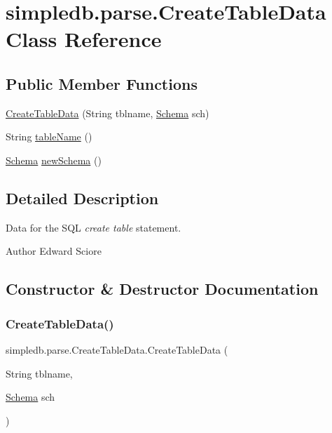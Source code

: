 \hypertarget{classsimpledb_1_1parse_1_1CreateTableData}{}\section{simpledb.\+parse.\+Create\+Table\+Data Class Reference}
\label{classsimpledb_1_1parse_1_1CreateTableData}
\subsection*{Public Member Functions}
\begin{DoxyCompactItemize}
\item 
\hyperlink{classsimpledb_1_1parse_1_1CreateTableData_a5167520c8a9b9829f304ce5a22bd162b}{Create\+Table\+Data} (String tblname, \hyperlink{classsimpledb_1_1record_1_1Schema}{Schema} sch)
\item 
String \hyperlink{classsimpledb_1_1parse_1_1CreateTableData_a9fa3eaadef74386e30af0aaa8b52c272}{table\+Name} ()
\item 
\hyperlink{classsimpledb_1_1record_1_1Schema}{Schema} \hyperlink{classsimpledb_1_1parse_1_1CreateTableData_a857ab82373dbaca585855cbe46819716}{new\+Schema} ()
\end{DoxyCompactItemize}


\subsection{Detailed Description}
Data for the S\+QL {\itshape create table} statement. \begin{DoxyAuthor}{Author}
Edward Sciore 
\end{DoxyAuthor}


\subsection{Constructor \& Destructor Documentation}
\mbox{\label{classsimpledb_1_1parse_1_1CreateTableData_a5167520c8a9b9829f304ce5a22bd162b}} 
\subsubsection{\texorpdfstring{Create\+Table\+Data()}{CreateTableData()}}
{\footnotesize\ttfamily simpledb.\+parse.\+Create\+Table\+Data.\+Create\+Table\+Data (\begin{DoxyParamCaption}\item[{String}]{tblname,  }\item[{\hyperlink{classsimpledb_1_1record_1_1Schema}{Schema}}]{sch }\end{DoxyParamCaption})\hspace{0.3cm}{\ttfamily [inline]}}

